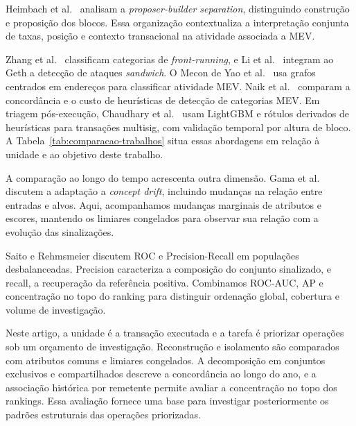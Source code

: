 Heimbach et al.\ \cite{Heimbach2023} analisam a \textit{proposer-builder separation}, distinguindo construção e proposição dos blocos. Essa organização contextualiza a interpretação conjunta de taxas, posição e contexto transacional na atividade associada a MEV.

Zhang et al.\ \cite{Zhang2024FRAD} classificam categorias de \textit{front-running}, e Li et al.\ \cite{Li2024Geth} integram ao Geth a detecção de ataques \textit{sandwich}. O Mecon de Yao et al.\ \cite{Yao2025Mecon} usa grafos centrados em endereços para classificar atividade MEV. Naik et al.\ \cite{Naik2026Agreement} comparam a concordância e o custo de heurísticas de detecção de categorias MEV. Em triagem pós-execução, Chaudhary et al.\ \cite{Chaudhary2026Multisig} usam LightGBM e rótulos derivados de heurísticas para transações multisig, com validação temporal por altura de bloco. A Tabela~\ref{tab:comparacao-trabalhos} situa essas abordagens em relação à unidade e ao objetivo deste trabalho.



A comparação ao longo do tempo acrescenta outra dimensão. Gama et al.\ \cite{Gama2014} discutem a adaptação a \textit{concept drift}, incluindo mudanças na relação entre entradas e alvos. Aqui, acompanhamos mudanças marginais de atributos e escores, mantendo os limiares congelados para observar sua relação com a evolução das sinalizações.

Saito e Rehmsmeier \cite{Saito2015} discutem ROC e Precision-Recall em populações desbalanceadas. Precision caracteriza a composição do conjunto sinalizado, e recall, a recuperação da referência positiva. Combinamos ROC-AUC, AP e concentração no topo do ranking para distinguir ordenação global, cobertura e volume de investigação.

Neste artigo, a unidade é a transação executada e a tarefa é priorizar operações sob um orçamento de investigação. Reconstrução e isolamento são comparados com atributos comuns e limiares congelados. A decomposição em conjuntos exclusivos e compartilhados descreve a concordância ao longo do ano, e a associação histórica por remetente permite avaliar a concentração no topo dos rankings. Essa avaliação fornece uma base para investigar posteriormente os padrões estruturais das operações priorizadas.
